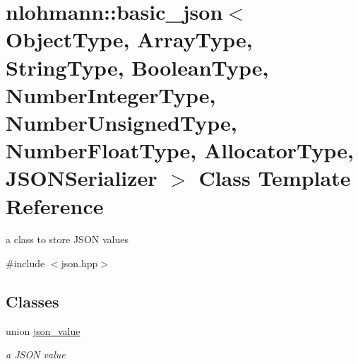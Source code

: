 \hypertarget{classnlohmann_1_1basic__json}{}\section{nlohmann\+:\+:basic\+\_\+json$<$ Object\+Type, Array\+Type, String\+Type, Boolean\+Type, Number\+Integer\+Type, Number\+Unsigned\+Type, Number\+Float\+Type, Allocator\+Type, J\+S\+O\+N\+Serializer $>$ Class Template Reference}
\label{classnlohmann_1_1basic__json}


a class to store J\+S\+ON values  




{\ttfamily \#include $<$json.\+hpp$>$}

\subsection*{Classes}
\begin{DoxyCompactItemize}
\item 
union \mbox{\hyperlink{unionnlohmann_1_1basic__json_1_1json__value}{json\+\_\+value}}
\begin{DoxyCompactList}\small\item\em a J\+S\+ON value \end{DoxyCompactList}\end{DoxyCompactItemize}
